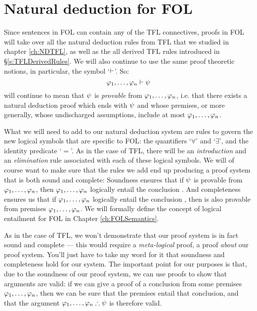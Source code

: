 \chapter{Natural deduction for FOL}\label{ch:NDFOL}


Since sentences in FOL can contain any of the TFL connectives, proofs in FOL will take over all the natural deduction rules from TFL that we studied in chapter \ref{ch:NDTFL}, as well as the all derived  TFL rules introduced in \S \ref{s:TFLDerivedRules}.  We will also continue to use the same proof theoretic notions, in particular, the symbol `$\vdash$'.  So:
$$\mathcal{\varphi}_1, \ldots, \mathcal{\varphi}_n \vdash \mathcal{\psi}$$
will continue to mean that $\mathcal{\psi}$ is \emph{provable} from $\mathcal{\varphi}_1, \ldots, \mathcal{\varphi}_n$, i.e. that there exists a natural deduction proof which ends with $\mathcal{\psi}$ and whose premises, or more generally, whose undischarged assumptions, include at most $\mathcal{\varphi}_1, \ldots, \mathcal{\varphi}_n$.


What we will need to add to our natural deduction system are rules to govern the new logical symbols that are specific to FOL: the quantifiers `$\forall$' and `$\exists$', and the identity predicate `$=$'.  As in the case of TFL, there will be an \emph{introduction} and an \emph{elimination} rule associated with each of these logical symbols.  We will of course want to make sure that the rules we add end up producing a proof system that is both sound and complete:
Soundness ensures that if $\mathcal{\psi}$ is provable from $\mathcal{\varphi}_1, \ldots, \mathcal{\varphi}_n$, then $\mathcal{\varphi}_1, \ldots, \mathcal{\varphi}_n$ logically entail the conclusion \meta{\psi}.  And completeness ensures us that if $\mathcal{\varphi}_1, \ldots, \mathcal{\varphi}_n$ logically entail the conclusion \meta{\psi}, then \meta{\psi} is also provable from premises $\mathcal{\varphi}_1, \ldots, \mathcal{\varphi}_n$.  We will formally define the concept of logical entailment  for FOL in Chapter \ref{ch:FOLSemantics}.

As in the case of TFL, we won't demonstrate that our proof system is in fact sound and complete --- this would require a \emph{meta-logical} proof, a proof \emph{about} our proof system.  You'll just have to take my word for it that soundness and completeness hold for our system. The important point for our purposes is that, due to the soundness of our proof system, we can use proofs to show that arguments are valid: if we can give a proof of a conclusion \meta{\psi} from some premises $\mathcal{\varphi}_1, \ldots, \mathcal{\varphi}_n$, then we can be sure that the premises entail that conclusion, and that the argument $\mathcal{\varphi}_1, \ldots, \mathcal{\varphi}_n \therefore \mathcal{\psi}$ is therefore valid.

